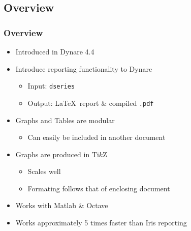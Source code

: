\documentclass[10pt]{beamer}
\begin{document}
\subsection{Overview}
\begin{frame}
  \frametitle{Overview}
  \begin{itemize}
  \item Introduced in Dynare 4.4
  \item Introduce reporting functionality to Dynare
      \begin{itemize}
      \item Input: \texttt{dseries}
      \item Output: \LaTeX\ report \& compiled \texttt{.pdf}
      \end{itemize}
    \item Graphs and Tables are modular
      \begin{itemize}
      \item Can easily be included in another document
      \end{itemize}
    \item Graphs are produced in Ti$k$Z
      \begin{itemize}
      \item Scales well
      \item Formating follows that of enclosing document
      \end{itemize}
    \item Works with Matlab \& Octave
    \item Works approximately 5 times faster than Iris reporting
  \end{itemize}
\end{frame}
\end{document}
